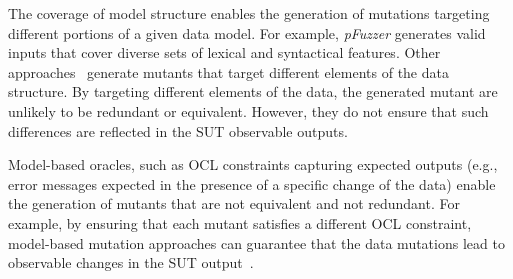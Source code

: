 The coverage of model structure enables the generation of mutations targeting different portions of a given data model.
For example, \emph{pFuzzer} generates valid inputs that cover diverse sets of lexical and syntactical features.
Other approaches~\cite{di2015generating} generate mutants that target different elements of the data structure.
By targeting different elements of the data, the generated mutant are unlikely to be redundant or equivalent. However, they do not ensure that such differences are reflected in the SUT observable outputs.


Model-based oracles, such as OCL constraints capturing expected outputs (e.g., error messages expected in the presence of a specific change of the data) enable the generation of mutants that are not equivalent and not redundant. For example, by ensuring that each mutant satisfies a different OCL constraint, model-based mutation approaches can guarantee that the data mutations lead to observable changes in the SUT output~\cite{di2015generating}.


